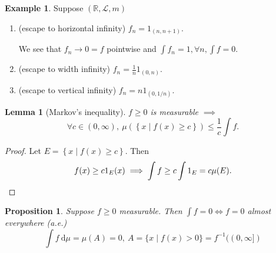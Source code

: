 \documentclass{report}
\newcommand{\R}{\mathbb{R}}
\newcommand{\df}{\ \mathrm{d}}
\newtheorem{lemma}[theorem]{Lemma}
\newtheorem{proposition}[theorem]{Proposition}
\theoremstyle{definition}
\newtheorem{example}[theorem]{Example}
\theoremstyle{remark}
\begin{document}
\begin{example}
	Suppose $(\R, \mathcal{L}, m)$
	\begin{enumerate}
		\item (escape to horizontal infinity) $f_n = 1_{(n, n+1)}$.
		
		We see that $f_n \to 0 = f$ pointwise and $\int f_n = 1, \forall n, \int f = 0$.

		\item (escape to width infinity) $f_n = \frac{1}{n}1_{(0, n)}$.
		\item (escape to vertical infinity) $f_n = n1_{(0, 1/n)}$.
	\end{enumerate}	
\end{example}

\begin{lemma}[Markov's inequality]
	$f \geq 0$ is measurable $\implies$ \[\forall c \in (0, \infty),\ \mu\left(\left\lbrace x \mid f(x) \geq c \right\rbrace\right) \leq \frac{1}{c}\int f.\]
\end{lemma}
\begin{proof}
	Let $E = \left\lbrace x \mid f(x) \geq c \right\rbrace$. Then \[f(x) \geq c1_{E}(x) \implies \int f \geq c\int 1_E = c \mu(E). \qedhere\] 
\end{proof}
\begin{proposition}\label{prop:zeroint}
	Suppose $f \geq 0$ measurable. Then $\int f = 0 \iff f = 0$ almost everywhere (a.e.) \[\int f \df\mu = \mu(A) = 0,\ A = \{x \mid f(x) > 0\} = f^{-1}((0, \infty])\]
\end{proposition}
\end{document}
